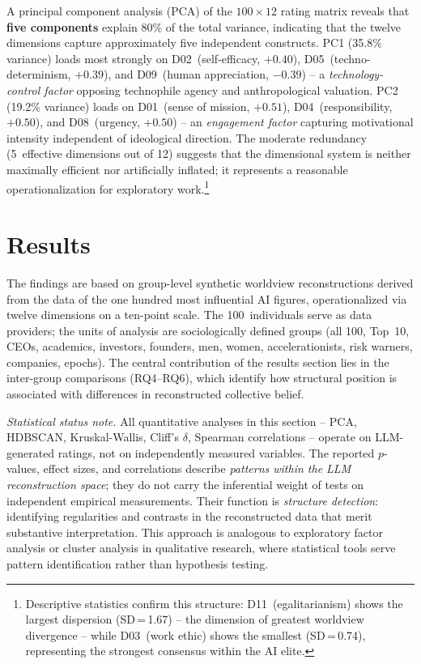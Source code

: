 \documentclass[12pt,a4paper]{article}
\begin{document}
A principal component analysis (PCA) of the $100 \times 12$ rating matrix reveals that \textbf{five components} explain 80\% of the total variance, indicating that the twelve dimensions capture approximately five independent constructs. PC1 (35.8\% variance) loads most strongly on D02~(self-efficacy, $+0.40$), D05~(techno-determinism, $+0.39$), and D09~(human appreciation, $-0.39$) -- a \emph{technology-control factor} opposing technophile agency and anthropological valuation. PC2 (19.2\% variance) loads on D01~(sense of mission, $+0.51$), D04~(responsibility, $+0.50$), and D08~(urgency, $+0.50$) -- an \emph{engagement factor} capturing motivational intensity independent of ideological direction. The moderate redundancy (5~effective dimensions out of 12) suggests that the dimensional system is neither maximally efficient nor artificially inflated; it represents a reasonable operationalization for exploratory work.\footnote{Descriptive statistics confirm this structure: D11~(egalitarianism) shows the largest dispersion (SD\,=\,1.67) -- the dimension of greatest worldview divergence -- while D03~(work ethic) shows the smallest (SD\,=\,0.74), representing the strongest consensus within the AI elite.}


\section{Results}
\label{sec:ergebnisse}

The findings are based on group-level synthetic worldview reconstructions derived from the data of the one hundred most influential AI figures, operationalized via twelve dimensions on a ten-point scale. The 100~individuals serve as data providers; the units of analysis are sociologically defined groups (all 100, Top~10, CEOs, academics, investors, founders, men, women, accelerationists, risk warners, companies, epochs). The central contribution of the results section lies in the inter-group comparisons (RQ4--RQ6), which identify how structural position is associated with differences in reconstructed collective belief.

\emph{Statistical status note.} All quantitative analyses in this section -- PCA, HDBSCAN, Kruskal-Wallis, Cliff's $\delta$, Spearman correlations -- operate on LLM-generated ratings, not on independently measured variables. The reported $p$-values, effect sizes, and correlations describe \emph{patterns within the LLM reconstruction space}; they do not carry the inferential weight of tests on independent empirical measurements. Their function is \emph{structure detection}: identifying regularities and contrasts in the reconstructed data that merit substantive interpretation. This approach is analogous to exploratory factor analysis or cluster analysis in qualitative research, where statistical tools serve pattern identification rather than hypothesis testing.
\end{document}
